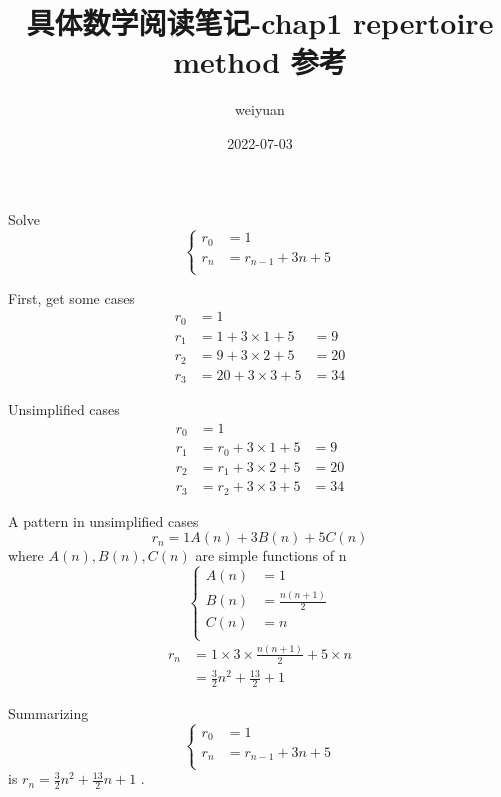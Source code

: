 \documentclass[mode=geye]{elegantnote}
\title{具体数学阅读笔记-chap1 repertoire method 参考}
\author{weiyuan}
\date{2022-07-03}
\begin{document}
\maketitle
Solve 
\begin{equation*}
    \left\{
        \begin{array}{ll}
            r_0 &= 1\\
            r_n &= r_{n-1}+3n+5\\ 
        \end{array}
    \right.
\end{equation*}

First, get some cases
\begin{align*}
    r_0 &= 1 & \\
    r_1 &= 1+3\times 1 + 5 &= 9  \\
    r_2 &= 9+3\times 2 + 5 &= 20 \\
    r_3 &= 20+3\times 3 + 5 &= 34 
\end{align*}

Unsimplified cases
\begin{align*}
    r_0 &= 1 & \\
    r_1 &= r_0+3\times 1 + 5 &= 9  \\
    r_2 &= r_1+3\times 2 + 5 &= 20 \\
    r_3 &= r_2+3\times 3 + 5 &= 34 
\end{align*}

A pattern in unsimplified cases
\begin{equation*}
    r_n = 1 A(n) + 3 B(n) +5 C(n)
\end{equation*}
where $ A(n), B(n), C(n) $ are simple functions of n
\begin{equation*}
    \left\{
        \begin{array}{ll}
            A(n) &= 1\\
            B(n) &= \frac{n(n+1)}{2}\\
            C(n) &= n\\
        \end{array}
    \right.
\end{equation*}
\begin{align*}
    r_n &= 1 \times 3 \times \frac{n(n+1)}{2} +5 \times n\\
        &= \frac{3}{2}n^2 +\frac{13}{2}+1
\end{align*}

Summarizing 
\begin{equation*}
    \left\{
        \begin{array}{ll}
            r_0 &= 1\\
            r_n &= r_{n-1}+3n+5\\
        \end{array}
    \right.
\end{equation*}
is $ r_n=\frac{3}{2}n^2+\frac{13}{2}n+1 $ .
\end{document}
